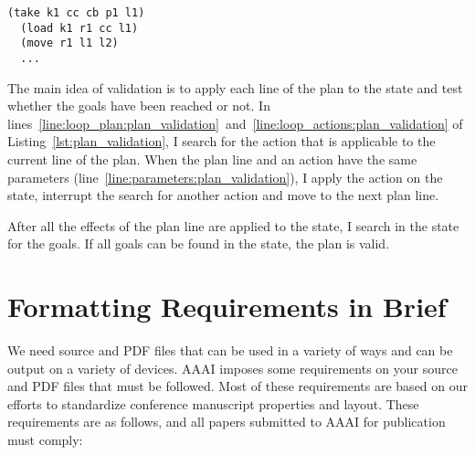 \documentclass[letterpaper]{article}
\begin{document}
\begin{lstlisting}[label=lst:plan_example, caption={Example of a plan}, captionpos=b]
  (take k1 cc cb p1 l1)
  (load k1 r1 cc l1)
  (move r1 l1 l2)
  ...
\end{lstlisting}

The main idea of validation is to apply each line of the plan to the state and test whether the goals have been reached or not. In lines~\ref{line:loop_plan:plan_validation}~and~\ref{line:loop_actions:plan_validation} of Listing~\ref{lst:plan_validation}, I search for the action that is applicable to the current line of the plan. When the plan line and an action have the same parameters (line~\ref{line:parameters:plan_validation}), I apply the action on the state, interrupt the search for another action and move to the next plan line.

After all the effects of the plan line are applied to the state, I search in the state for the goals. If all goals can be found in the state, the plan is valid.

\section{Formatting Requirements in Brief}
We need source and PDF files that can be used in a variety of ways and can be output on a variety of devices. AAAI imposes some requirements on your source and PDF files that must be followed. Most of these requirements are based on our efforts to standardize conference manuscript properties and layout. These requirements are as follows, and all papers submitted to AAAI for publication must comply:
\end{document}
